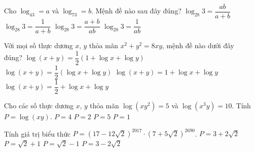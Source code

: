 \begin{ex}%
	Cho $\log_43=a$ và $\log_73=b$. Mệnh đề nào sau đây đúng?
	\choice
	{\True $\log_{28}3=\dfrac{ab}{a+b}$}
	{$\log_{28}3=\dfrac{1}{a+b}$}
	{$\log_{28}3=\dfrac{a+b}{ab}$}
	{$\log_{28}3=\dfrac{1}{ab}$}
\end{ex}

\begin{ex}%
	Với mọi số thực dương $x$, $y$ thỏa mãn $x^2+y^2=8xy$, mệnh đề nào dưới đây đúng? 
	\choice
	{\True $\log(x+y)=\dfrac{1}{2}(1+\log x+\log y)$}
	{$\log(x+y)=\dfrac{1}{2}(\log x+\log y)$}
	{$\log(x+y)=1+\log x+\log y$}
	{$\log(x+y)=\dfrac{1}{2}+\log x+\log y$}
\end{ex}

\begin{ex}%
	Cho các số thực dương $x$, $y$ thỏa mãn $\log(xy^2)=5$ và $\log(x^3y)=10$. Tính $P=\log(xy)$.
	\choice
	{\True $P=4$}
	{$P=2$}
	{$P=5$}
	{$P=1$}
\end{ex}

\begin{ex}%
	Tính giá trị biểu thức $P=\left(17-12\sqrt{2}\right)^{2017}\cdot\left(7+5\sqrt{2}\right)^{2690}$.
	\choice
	{\True $P=3+2\sqrt{2}$}
	{$P=\sqrt{2}+1$}
	{$P=\sqrt{2}-1$}
	{$P=3-2\sqrt{2}$}
\end{ex}

